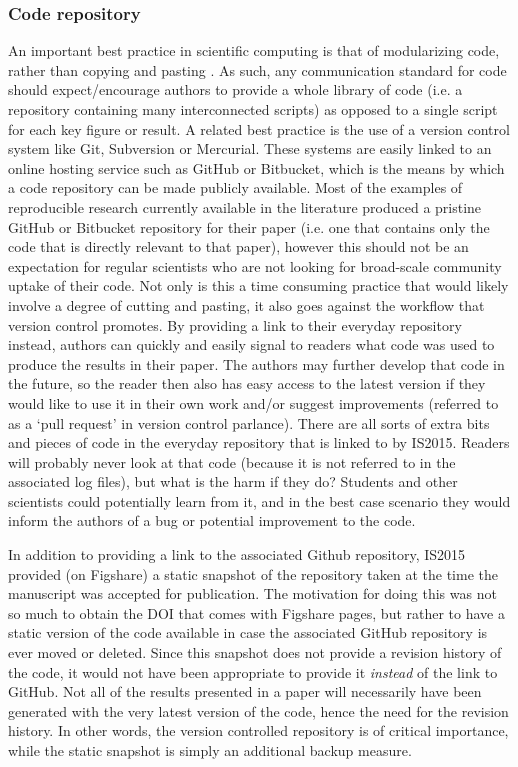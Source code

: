 \subsubsection{Code repository}

An important best practice in scientific computing is that of modularizing code, rather than copying and pasting \citep{Wilson2014a}. As such, any communication standard for code should expect/encourage authors to provide a whole library of code (i.e. a repository containing many interconnected scripts) as opposed to a single script for each key figure or result. A related best practice is the use of a version control system like Git, Subversion or Mercurial. These systems are easily linked to an online hosting service such as GitHub or Bitbucket, which is the means by which a code repository can be made publicly available. Most of the examples of reproducible research currently available in the literature produced a pristine GitHub or Bitbucket repository for their paper (i.e. one that contains only the code that is directly relevant to that paper), however this should not be an expectation for regular scientists who are not looking for broad-scale community uptake of their code. Not only is this a time consuming practice that would likely involve a degree of cutting and pasting, it also goes against the workflow that version control promotes. By providing a link to their everyday repository instead, authors can quickly and easily signal to readers what code was used to produce the results in their paper. The authors may further develop that code in the future, so the reader then also has easy access to the latest version if they would like to use it in their own work and/or suggest improvements (referred to as a `pull request' in version control parlance). There are all sorts of extra bits and pieces of code in the everyday repository that is linked to by IS2015. Readers will probably never look at that code (because it is not referred to in the associated log files), but what is the harm if they do? Students and other scientists could potentially learn from it, and in the best case scenario they would inform the authors of a bug or potential improvement to the code.        

In addition to providing a link to the associated Github repository, IS2015 provided (on Figshare) a static snapshot of the repository taken at the time the manuscript was accepted for publication. The motivation for doing this was not so much to obtain the DOI that comes with Figshare pages, but rather to have a static version of the code available in case the associated GitHub repository is ever moved or deleted. Since this snapshot does not provide a revision history of the code, it would not have been appropriate to provide it \textit{instead} of the link to GitHub. Not all of the results presented in a paper will necessarily have been generated with the very latest version of the code, hence the need for the revision history. In other words, the version controlled repository is of critical importance, while the static snapshot is simply an additional backup measure.  

